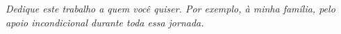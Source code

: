 
\begin{dedicatoria}
   \vspace*{\fill}
   \hspace{.45\textwidth}
   \begin{minipage}{.5\textwidth}
      \textit{Dedique este trabalho a quem você quiser.
      Por exemplo, à minha família, pelo apoio incondicional
      durante toda essa jornada.}
   \end{minipage}
\end{dedicatoria}
